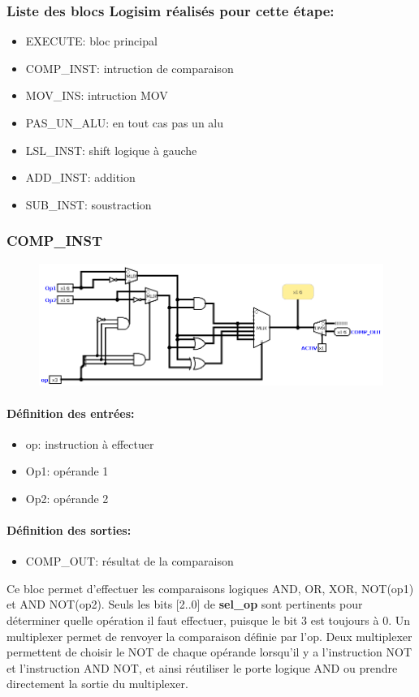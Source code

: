 \documentclass[a4paper]{article} %
\begin{document}
\subsubsection{Liste des blocs Logisim réalisés pour cette étape:}
\begin{itemize}
    \item EXECUTE: bloc principal
    \item COMP\_INST: intruction de comparaison
    \item MOV\_INS: intruction MOV
    \item PAS\_UN\_ALU: en tout cas pas un alu
    \item LSL\_INST: shift logique à gauche
    \item ADD\_INST: addition
    \item SUB\_INST: soustraction
\end{itemize}
\subsubsection{COMP\_INST} \label{comp_inst}
\begin{figure}[H]
    \centering
    \includegraphics[width=1\textwidth]{src/COMP_INST.png}
    \label{fig:comp_inst_pic}
\end{figure}
\paragraph{Définition des entrées:}
\begin{itemize}
    \item     op: instruction à effectuer
    \item     Op1: opérande 1
    \item     Op2: opérande 2
\end{itemize}

\paragraph{Définition des sorties:}
\begin{itemize}
    \item     COMP\_OUT: résultat de la comparaison
\end{itemize}
\medskip
Ce bloc permet d'effectuer les comparaisons logiques AND, OR, XOR, NOT(op1) et AND NOT(op2). Seuls les bits [2..0] de \textbf{sel\_op} sont pertinents pour déterminer quelle opération il faut effectuer, puisque le bit 3 est toujours à 0. Un multiplexer permet de renvoyer la comparaison définie par l'op. Deux multiplexer permettent de choisir le NOT de chaque opérande lorsqu'il y a l'instruction NOT et l'instruction AND NOT, et ainsi réutiliser le porte logique AND ou prendre directement la sortie du multiplexer.
\end{document}
